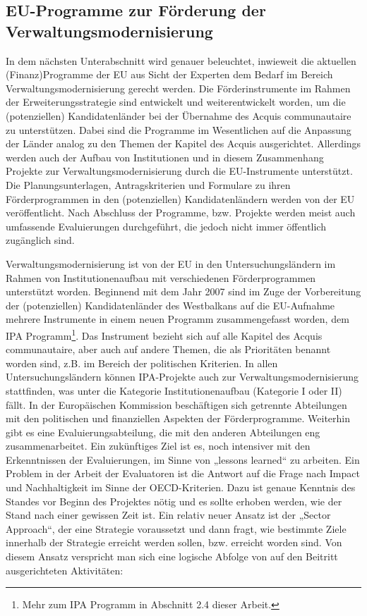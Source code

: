 \subsection{EU-Programme zur Förderung der Verwaltungsmodernisierung }
In dem nächsten Unterabschnitt wird genauer beleuchtet, inwieweit die aktuellen (Finanz)Programme der EU aus Sicht der Experten dem Bedarf im Bereich Verwaltungsmodernisierung gerecht werden. Die Förderinstrumente im Rahmen der Erweiterungsstrategie sind entwickelt und weiterentwickelt worden, um die (potenziellen) Kandidatenländer bei der Übernahme des Acquis communautaire zu unterstützen. Dabei sind die Programme im Wesentlichen auf die Anpassung der Länder analog zu den Themen der Kapitel des Acquis ausgerichtet. Allerdings werden auch der Aufbau von Institutionen und in diesem Zusammenhang Projekte zur Verwaltungsmodernisierung durch die EU-Instrumente unterstützt. Die Planungsunterlagen, Antragskriterien und Formulare zu ihren Förderprogrammen in den (potenziellen) Kandidatenländern werden von der EU veröffentlicht. Nach Abschluss der Programme, bzw. Projekte werden meist auch umfassende Evaluierungen durchgeführt, die jedoch nicht immer öffentlich zugänglich sind.\par
Verwaltungsmodernisierung ist von der EU in den Untersuchungsländern im Rahmen von Institutionenaufbau mit verschiedenen Förderprogrammen unterstützt worden. Beginnend mit dem Jahr 2007 sind im Zuge der Vorbereitung der (potenziellen) Kandidatenländer des Westbalkans auf die EU-Aufnahme mehrere Instrumente in einem neuen Programm zusammengefasst worden, dem IPA Programm\footnote{Mehr zum IPA Programm in Abschnitt 2.4 dieser Arbeit.}. Das Instrument bezieht sich auf alle Kapitel des Acquis communautaire, aber auch auf andere Themen, die als Prioritäten benannt worden sind, z.B. im Bereich der politischen Kriterien. In allen Untersuchungsländern können IPA-Projekte auch zur Verwaltungsmodernisierung stattfinden, was unter die Kategorie Institutionenaufbau (Kategorie I oder II) fällt. In der Europäischen Kommission beschäftigen sich getrennte Abteilungen mit den politischen und finanziellen Aspekten der Förderprogramme. Weiterhin gibt es eine Evaluierungsabteilung, die mit den anderen Abteilungen eng zusammenarbeitet. Ein zukünftiges Ziel ist es, noch intensiver mit den Erkenntnissen der Evaluierungen, im Sinne von „lessons learned“ zu arbeiten. Ein Problem in der Arbeit der Evaluatoren ist die Antwort auf die Frage nach Impact und Nachhaltigkeit im Sinne der OECD-Kriterien. Dazu ist genaue Kenntnis des Standes vor Beginn des Projektes nötig und es sollte erhoben werden, wie der Stand nach einer gewissen Zeit ist. Ein relativ neuer Ansatz ist der „Sector Approach“, der eine Strategie voraussetzt und dann fragt, wie bestimmte Ziele innerhalb der Strategie erreicht werden sollen, bzw. erreicht worden sind. Von diesem Ansatz verspricht man sich eine logische Abfolge von auf den Beitritt ausgerichteten Aktivitäten:
